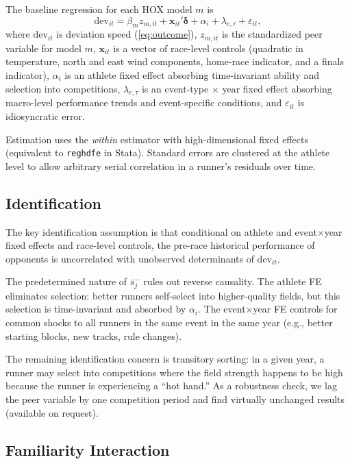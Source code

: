 \documentclass[12pt]{article}
\theoremstyle{definition}
\theoremstyle{remark}
\begin{document}
The baseline regression for each HOX model $m$ is
\begin{equation}
\text{dev}_{it} = \beta_m z_{m,it} + \mathbf{x}_{it}'\boldsymbol{\delta} +
\alpha_i + \lambda_{e,\tau} + \varepsilon_{it},
\label{eq:baseline}
\end{equation}
where $\text{dev}_{it}$ is deviation speed (\ref{eq:outcome}),
$z_{m,it}$ is the standardized peer variable for model $m$,
$\mathbf{x}_{it}$ is a vector of race-level controls (quadratic in temperature,
north and east wind components, home-race indicator, and a finals indicator),
$\alpha_i$ is an athlete fixed effect absorbing time-invariant ability and
selection into competitions, $\lambda_{e,\tau}$ is an event-type $\times$ year
fixed effect absorbing macro-level performance trends and event-specific conditions,
and $\varepsilon_{it}$ is idiosyncratic error.

Estimation uses the \emph{within} estimator with high-dimensional fixed effects
(equivalent to \texttt{reghdfe} in Stata).
Standard errors are clustered at the athlete level to allow arbitrary serial
correlation in a runner's residuals over time.

\subsection{Identification}

The key identification assumption is that conditional on athlete and event$\times$year
fixed effects and race-level controls, the pre-race historical performance of
opponents is uncorrelated with unobserved determinants of $\text{dev}_{it}$.

The predetermined nature of $\bar{s}_j^-$ rules out reverse causality.
The athlete FE eliminates selection: better runners self-select into higher-quality
fields, but this selection is time-invariant and absorbed by $\alpha_i$.
The event$\times$year FE controls for common shocks to all runners in the
same event in the same year (e.g., better starting blocks, new tracks, rule changes).

The remaining identification concern is transitory sorting: in a given year, a
runner may select into competitions where the field strength happens to be high
because the runner is experiencing a ``hot hand.''
As a robustness check, we lag the peer variable by one competition period and
find virtually unchanged results (available on request).

\subsection{Familiarity Interaction}
\end{document}
